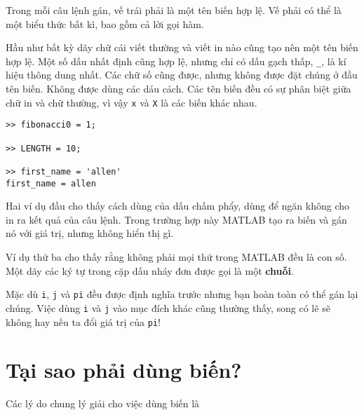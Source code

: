 \documentclass[12pt]{book}
\begin{document}
Trong mỗi câu lệnh gán, vế trái phải là một tên biến hợp lệ. Vế phải
có thể là một biểu thức bất kì, bao gồm cả lời gọi hàm.

Hầu như bất kỳ dãy chữ cái viết thường và viết in nào cũng tạo nên
một tên biến hợp lệ. Một số dấu nhất định cũng hợp lệ, nhưng chỉ có
dấu gạch thấp, {\tt \_}, là kí hiệu thông dung nhất. Các chữ số cũng
được, nhưng không được đặt chúng ở đầu tên biến. Không được dùng
các dáu cách. Các tên biến đều có sự phân biệt giữa chữ in và chữ
thường, vì vậy {\tt x} và {\tt X} là các biến khác nhau.

\begin{verbatim}
>> fibonacci0 = 1;

>> LENGTH = 10;

>> first_name = 'allen'
first_name = allen
\end{verbatim}
%
Hai ví dụ đầu cho thấy cách dùng của dấu chấm phẩy, dùng để ngăn
không cho in ra kết quả của câu lệnh. Trong trường hợp này MATLAB
tạo ra biến và gán nó với giá trị, nhưng không hiển thị gì.

Ví dụ thứ ba cho thấy rằng không phải mọi thứ trong MATLAB đều
là con số. Một dãy các ký tự trong cặp dấu nháy đơn được gọi là
một {\bf chuỗi}.

Mặc dù {\tt i}, {\tt j} và {\tt pi} đều được định nghĩa trước nhưng
bạn hoàn toàn có thể gán lại chúng. Việc dùng {\tt i} và {\tt j} vào
mục đích khác cũng thường thấy, song có lẽ sẽ không hay nếu ta
đổi giá trị của {\tt pi}!

\section{Tại sao phải dùng biến?}

Các lý do chung lý giải cho việc dùng biến là
\end{document}
